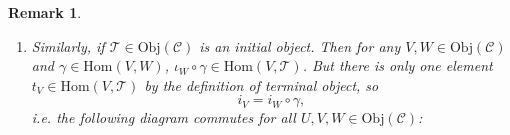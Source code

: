 \documentclass[12pt]{amsbook}
\newtheorem{remark}[theorem]{Remark}
\begin{document}
\begin{remark}
\begin{enumerate}
    \item Similarly, if $\mathcal{T} \in \mathrm{Obj}(\mathcal{C})$ is an initial object. Then for any $V, W \in \mathrm{Obj}(\mathcal{C})$ and $\gamma \in \mathrm{Hom}(V,W)$, $\iota_W \circ \gamma \in \mathrm{Hom}(V,\mathcal{T})$. But there is only one element $t_V \in \mathrm{Hom}(V,\mathcal{T})$ by the definition of terminal object, so
    $$i_V = i_W \circ \gamma,$$
    i.e. the following diagram commutes for all $U, V, W \in \mathrm{Obj}(\mathcal{C})$:
\begin{center}
\end{center}
\end{enumerate}
\end{remark}
\end{document}
